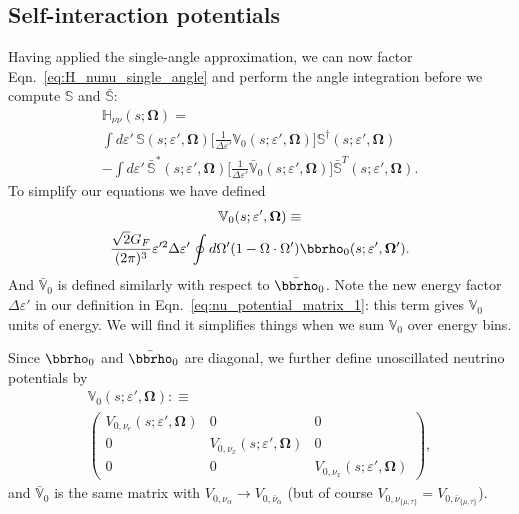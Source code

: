 \documentclass[aps,prd,twocolumn,superscriptaddress,groupedaddress]{revtex4}
\begin{document}
\subsection*{Self-interaction potentials}
Having applied the single-angle approximation, we can now factor
Eqn.~\ref{eq:H_nunu_single_angle} and perform the angle integration
before we compute $\mathbb{S}$ and $\bar{\mathbb{S}}$:
\begin{multline}
  \label{eq:H_nunu_factored}
  \mathbb{H}_{\nu\nu}(s;\bm{\Omega}) = \\
  \int d\varepsilon' \,
  \mathbb{S}(s;\varepsilon',\bm{\Omega})
  \bigg[
    \frac{1}{\Delta\varepsilon'}\mathbb{V}_0(s;\varepsilon',\bm{\Omega})
    \bigg]
  \mathbb{S}^\dagger(s;\varepsilon',\bm{\Omega}) \\
  -\int d\varepsilon' \,
  \bar{\mathbb{S}}^*(s;\varepsilon',\bm{\Omega})
  \bigg[
    \frac{1}{\Delta\varepsilon'} \bar{\mathbb{V}}_0(s;\varepsilon',\bm{\Omega})
    \bigg]
  \bar{\mathbb{S}}^T(s;\varepsilon',\bm{\Omega}).
\end{multline}
To simplify our equations we have defined
\begin{multline}
  \label{eq:nu_potential_matrix_1}
  \mathbb{V}_0(s;\varepsilon',\bm{\Omega}) \equiv \\
  \frac{\sqrt{2} G_F}{(2\pi)^3}\varepsilon'^2\Delta\varepsilon'
    \oint d\Omega' 
    (1-\Omega\cdot\Omega')
    \bbrho_0(s;\varepsilon',\bm{\Omega}').
\end{multline}
And $\bar{\mathbb{V}}_0$ is defined similarly with respect to $\bar{\bbrho}_0$.
Note the new energy factor $\Delta\varepsilon'$ in our definition
in Eqn.~\ref{eq:nu_potential_matrix_1}:
this term gives $\mathbb{V}_0$ units of energy.
We will find it simplifies things when we sum $\mathbb{V}_0$ over energy bins.

Since $\bbrho_0$ and $\bar{\bbrho}_0$ are diagonal, we further
define unoscillated neutrino potentials by
\begin{multline}
  \label{eq:nu_potential_matrix_2}
  \mathbb{V}_0(s;\varepsilon',\bm{\Omega}) :\equiv \\
  \left(
  \begin{matrix}
    V_{0,\nu_e}(s;\varepsilon',\bm{\Omega}) & 0 & 0 \\
    0 & V_{0,\nu_x}(s;\varepsilon',\bm{\Omega}) & 0 \\
    0 & 0 & V_{0,\nu_x}(s;\varepsilon',\bm{\Omega})
  \end{matrix}
  \right),
\end{multline}
and $\bar{\mathbb{V}}_0$ is the same matrix with
$V_{0,\nu_\alpha} \rightarrow V_{0,\bar{\nu}_\alpha}$
(but of course $V_{0,\nu_{\{\mu,\tau\}}}=V_{0,\bar{\nu}_{\{\mu,\tau\}}}$).
\end{document}
